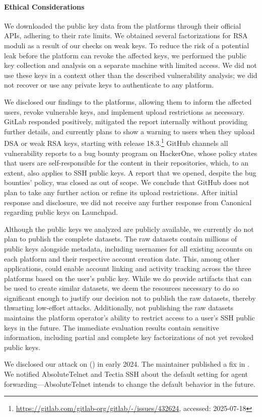 \paragraph{Ethical Considerations}
\label{sec:ethics}

We downloaded the public key data from the platforms through their official APIs, adhering to their rate limits. We obtained several factorizations for RSA moduli as a result of our checks on weak keys. To reduce the risk of a potential leak before the platform can revoke the affected keys, we performed the public key collection and analysis on a separate machine with limited access. We did not use these keys in a context other than the described vulnerability analysis; we did not recover or use any private keys to authenticate to any platform.

We disclosed our findings to the platforms, allowing them to inform the affected users, revoke vulnerable keys, and implement upload restrictions as necessary. GitLab responded positively, mitigated the report internally without providing further details, and currently plans to show a warning to users when they upload DSA or weak RSA keys, starting with release 18.3.\footnote{\url{https://gitlab.com/gitlab-org/gitlab/-/issues/432624}, accessed: 2025-07-18} GitHub channels all vulnerability reports to a bug bounty program on HackerOne, whose policy states that users are self-responsible for the content in their repositories, which, to an extent, also applies to SSH public keys. A report that we opened, despite the bug bounties' policy, was closed as out of scope. We conclude that GitHub does not plan to take any further action or refine its upload restrictions. After initial response and disclosure, we did not receive any further response from Canonical regarding public keys on Launchpad.

Although the public keys we analyzed are publicly available, we currently do not plan to publish the complete datasets. The raw datasets contain millions of public keys alongside metadata, including usernames for all existing accounts on each platform and their respective account creation date. This, among other applications, could enable account linking and activity tracking across the three platforms based on the user's public key. While we do provide artifacts that can be used to create similar datasets, we deem the resources necessary to do so significant enough to justify our decision not to publish the raw datasets, thereby thwarting low-effort attacks. Additionally, not publishing the raw datasets maintains the platform operator's ability to restrict access to a user's SSH public keys in the future. The immediate evaluation results contain sensitive information, including partial and complete key factorizations of not yet revoked public keys.

We disclosed our attack on \putty (\puttycve) in early 2024. The \putty maintainer published a fix in \putty \puttyfixedversion. We notified AbsoluteTelnet and Tectia SSH about the default setting for agent forwarding---AbsoluteTelnet intends to change the default behavior in the future.
